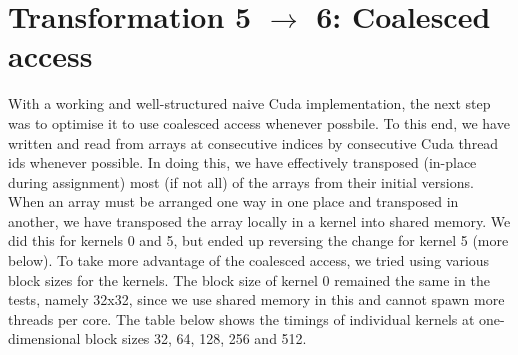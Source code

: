 \section{Transformation 5 $\rightarrow$ 6: Coalesced access}

With a working and well-structured naive Cuda implementation, the next step was to optimise it to use coalesced access whenever possbile. To this end, we have written and read from arrays at consecutive indices by consecutive Cuda thread ids whenever possible. In doing this, we have effectively transposed (in-place during assignment) most (if not all) of the arrays from their initial versions.\n
When an array must be arranged one way in one place and transposed in another, we have transposed the array locally in a kernel into shared memory. We did this for kernels 0 and 5, but ended up reversing the change for kernel 5 (more below).\n
To take more advantage of the coalesced access, we tried using various block sizes for the kernels. The block size of kernel 0 remained the same in the tests, namely 32x32, since we use shared memory in this and cannot spawn more threads per core. The table below shows the timings of individual kernels at one-dimensional block sizes 32, 64, 128, 256 and 512.

